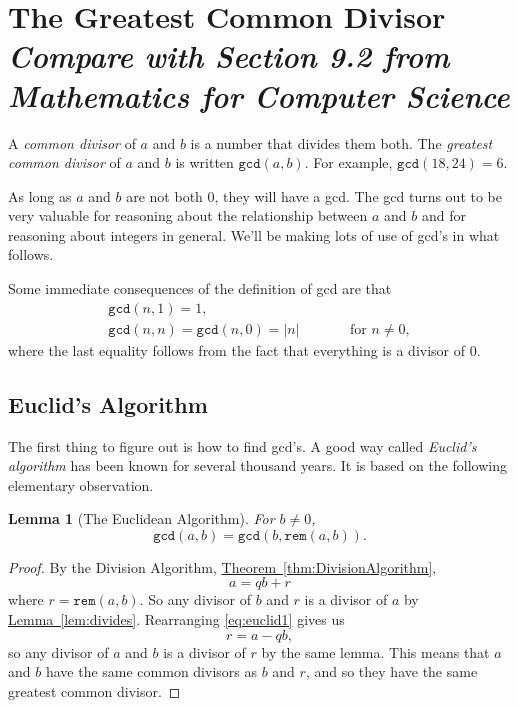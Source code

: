 \documentclass[11pt,oneside]{book}
\newtheorem{lem}[thm]{Lemma}
\theoremstyle{definition}
\begin{document}
\section[The Greatest Common Divisor]{The Greatest Common Divisor\\[0.5ex]
\normalsize\normalfont\textit{
    Compare with Section 9.2 from \emph{Mathematics for Computer Science}
}}
A \emph{common divisor} of $a$ and $b$ is a number that divides them both.
The \emph{greatest common divisor} of $a$ and $b$ is written $\texttt{gcd}(a, b)$.
For example, $\texttt{gcd}(18, 24) = 6$.

As long as $a$ and $b$ are not both 0, they will have a gcd.
The gcd turns out to be very valuable for reasoning about the relationship between $a$ and $b$ and for reasoning about integers in general.
We'll be making lots of use of gcd's in what
follows.

Some immediate consequences of the definition of gcd are that
\[\begin{array}{lcl}
    \texttt{gcd}(n, 1) = 1, && \\
    \texttt{gcd}(n, n) = \texttt{gcd}(n, 0) = |n| & \qquad & \text{for } n \neq 0,
\end{array}\]
where the last equality follows from the fact that everything is a divisor of 0.

\subsection{Euclid's Algorithm}
The first thing to figure out is how to find gcd's.
A good way called \emph{Euclid's
algorithm} has been known for several thousand years.
It is based on the following elementary observation.

\begin{lem}[The Euclidean Algorithm] \label{lem:EuclideanAlgorithm}
    For $b \neq 0$,
    \[ \texttt{gcd}(a, b) = \texttt{gcd}(b, \texttt{rem}(a, b)). \]
\end{lem}

\begin{proof}
    By the Division Algorithm, \hyperref[thm:DivisionAlgorithm]{Theorem~\ref*{thm:DivisionAlgorithm}},
    \begin{equation} a = qb + r \label{eq:euclid1} \end{equation}
    where $r = \texttt{rem}(a, b)$.
    So any divisor of $b$ and $r$ is a divisor of $a$ by \hyperref[lem:divides]{Lemma~\ref*{lem:divides}}.
    Rearranging \eqref{eq:euclid1} gives us
    \[ r = a - qb, \]
    so any divisor of $a$ and $b$ is a divisor of $r$ by the same lemma.
    This means that $a$ and $b$ have the same common divisors as $b$ and $r$, and so they have the same greatest common divisor.
\end{proof}
\end{document}
